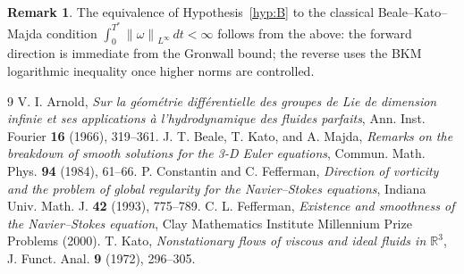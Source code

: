 \documentclass[11pt,reqno]{amsart}
\theoremstyle{definition}
\newtheorem{remark}[theorem]{Remark}
\newcommand{\norm}[1]{\left\| #1 \right\|}
\begin{document}
\begin{remark}
The equivalence of Hypothesis~\ref{hyp:B} to the classical Beale--Kato--Majda condition $\int_0^{T^*}\norm{\omega}_{L^\infty}\,dt < \infty$ follows from the above: the forward direction is immediate from the Gronwall bound; the reverse uses the BKM logarithmic inequality once higher norms are controlled.
\end{remark}

\begin{thebibliography}{9}
 V. I. Arnold, \emph{Sur la géométrie différentielle des groupes de Lie de dimension infinie et ses applications à l'hydrodynamique des fluides parfaits}, Ann. Inst. Fourier \textbf{16} (1966), 319--361.
 J. T. Beale, T. Kato, and A. Majda, \emph{Remarks on the breakdown of smooth solutions for the 3-D Euler equations}, Commun. Math. Phys. \textbf{94} (1984), 61--66.
 P. Constantin and C. Fefferman, \emph{Direction of vorticity and the problem of global regularity for the Navier--Stokes equations}, Indiana Univ. Math. J. \textbf{42} (1993), 775--789.
 C. L. Fefferman, \emph{Existence and smoothness of the Navier--Stokes equation}, Clay Mathematics Institute Millennium Prize Problems (2000).
 T. Kato, \emph{Nonstationary flows of viscous and ideal fluids in $\mathbb{R}^3$}, J. Funct. Anal. \textbf{9} (1972), 296--305.
\end{thebibliography}
\end{document}
